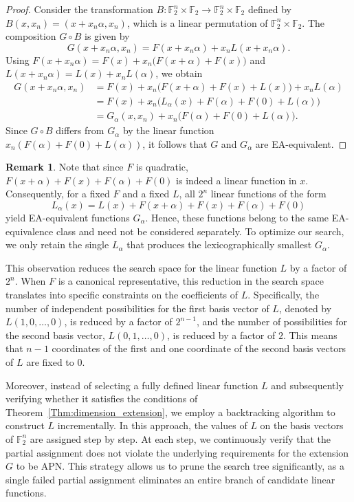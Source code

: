 \documentclass{amsart}[11pt]
\theoremstyle{plain}
\theoremstyle{definition}
\newtheorem{remark}[theorem]{Remark}
\numberwithin{theorem}{section}
\numberwithin{equation}{section}
\numberwithin{table}{section}
\numberwithin{figure}{section}
\numberwithin{algorithm}{section}
\def\F{\mathbb F}
\begin{document}
\begin{proof}
    Consider the transformation $B\colon \F_2^n \times \F_2 \to \F_2^n \times \F_2$ defined by $B(x, x_n) = (x + x_n \alpha, x_n)$, which is a linear permutation of $\F_2^n \times \F_2$.
    The composition $G \circ B$ is given by
    $$ G(x + x_n \alpha, x_n) = F(x + x_n \alpha) + x_n L(x + x_n \alpha). $$
    Using $F(x + x_n \alpha) = F(x) + x_n\big(F(x+\alpha) + F(x)\big)$ and $L(x + x_n \alpha) = L(x) + x_n L(\alpha)$, we obtain
    \begin{align*}
        G(x + x_n \alpha, x_n) 
        &= F(x) + x_n\big(F(x+\alpha) + F(x) + L(x)\big) + x_n L(\alpha) \\
        &= F(x) + x_n\big(L_\alpha(x) + F(\alpha) + F(0) + L(\alpha)\big) \\
        &= G_\alpha(x, x_n) + x_n\big(F(\alpha) + F(0) + L(\alpha)\big).
    \end{align*}
    Since $G \circ B$ differs from $G_\alpha$ by the linear function $x_n(F(\alpha) + F(0) + L(\alpha))$, it follows that $G$ and $G_\alpha$ are EA-equivalent.
\end{proof}

\begin{remark}
    Note that since $F$ is quadratic, $F(x+\alpha) + F(x) + F(\alpha) + F(0)$ is indeed a linear function in $x$.
    Consequently, for a fixed $F$ and a fixed $L$, all $2^n$ linear functions of the form
    $$ L_\alpha(x) = L(x) + F(x+\alpha) + F(x) + F(\alpha) + F(0) $$
    yield EA-equivalent functions $G_\alpha$.
    Hence, these functions belong to the same EA-equivalence class and need not be considered separately.
    To optimize our search, we only retain the single $L_\alpha$ that produces the lexicographically smallest $G_\alpha$.
\end{remark}

This observation reduces the search space for the linear function $L$ by a factor of $2^n$.
When $F$ is a canonical representative, this reduction in the search space translates into specific constraints on the coefficients of $L$.
Specifically, the number of independent possibilities for the first basis vector of $L$, denoted by $L(1,0, \dots, 0)$, is reduced by a factor of $2^{n-1}$, and the number of possibilities for the second basis vector, $L(0,1, \dots, 0)$, is reduced by a factor of $2$.
This means that $n-1$ coordinates of the first and one coordinate of the second basis vectors of $L$ are fixed to $0$.

Moreover, instead of selecting a fully defined linear function $L$ and subsequently verifying whether it satisfies the conditions of Theorem~\ref{Thm:dimension_extension}, we employ a backtracking algorithm to construct $L$ incrementally.
In this approach, the values of $L$ on the basis vectors of $\F_2^n$ are assigned step by step.
At each step, we continuously verify that the partial assignment does not violate the underlying requirements for the extension $G$ to be APN.
This strategy allows us to prune the search tree significantly, as a single failed partial assignment eliminates an entire branch of candidate linear functions.
\end{document}
